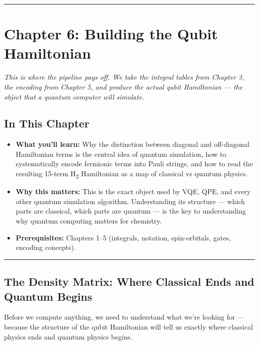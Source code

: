 \documentclass[
  11pt,
  oneside]{book}
\providecommand{\tightlist}{%
  \setlength{\itemsep}{0pt}\setlength{\parskip}{0pt}}
\begin{document}
\begin{center}\rule{0.5\linewidth}{0.5pt}\end{center}

\chapter{Chapter 6: Building the Qubit
Hamiltonian}\label{chapter-6-building-the-qubit-hamiltonian}

\emph{This is where the pipeline pays off. We take the integral tables
from Chapter 3, the encoding from Chapter 5, and produce the actual
qubit Hamiltonian --- the object that a quantum computer will simulate.}

\section{In This Chapter}\label{in-this-chapter-5}

\begin{itemize}
\tightlist
\item
  \textbf{What you'll learn:} Why the distinction between diagonal and
  off-diagonal Hamiltonian terms is the central idea of quantum
  simulation, how to systematically encode fermionic terms into Pauli
  strings, and how to read the resulting 15-term H\textsubscript{2} Hamiltonian as a map
  of classical vs quantum physics.
\item
  \textbf{Why this matters:} This is the exact object used by VQE, QPE,
  and every other quantum simulation algorithm. Understanding its
  structure --- which parts are classical, which parts are quantum ---
  is the key to understanding why quantum computing matters for
  chemistry.
\item
  \textbf{Prerequisites:} Chapters 1--5 (integrals, notation,
  spin-orbitals, gates, encoding concepts).
\end{itemize}

\begin{center}\rule{0.5\linewidth}{0.5pt}\end{center}

\section{The Density Matrix: Where Classical Ends and Quantum
Begins}\label{the-density-matrix-where-classical-ends-and-quantum-begins}

Before we compute anything, we need to understand what we're looking for
--- because the structure of the qubit Hamiltonian will tell us exactly
where classical physics ends and quantum physics begins.
\end{document}
